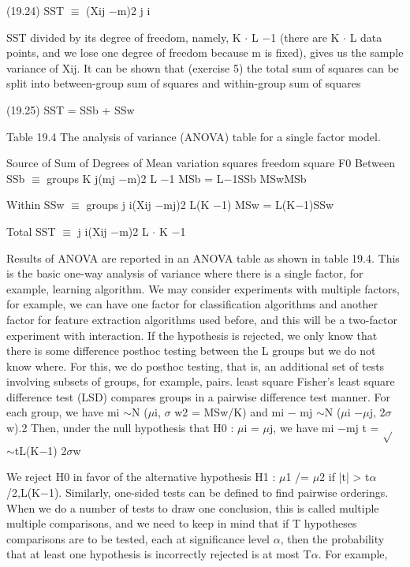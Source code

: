 (19.24) SST $\equiv$ (Xij $-$m)2 j i

SST divided by its degree of freedom, namely, K $\cdot$ L $-$1 (there are K $\cdot$ L data points, and we lose one degree of freedom because m is fixed), gives us the sample variance of Xij. It can be shown that (exercise 5) the total sum of squares can be split into between-group sum of squares and within-group sum of squares

(19.25) SST = SSb + SSw

Table 19.4 The analysis of variance (ANOVA) table for a single factor model.

Source of Sum of Degrees of Mean variation squares freedom square F0 Between SSb $\equiv$ groups K j(mj $-$m)2 L $-$1 MSb = L$-$1SSb MSwMSb

Within SSw $\equiv$ groups j i(Xij $-$mj)2 L(K $-$1) MSw = L(K$-$1)SSw

Total SST $\equiv$ j i(Xij $-$m)2 L $\cdot$ K $-$1

Results of ANOVA are reported in an ANOVA table as shown in table 19.4. This is the basic one-way analysis of variance where there is a single factor, for example, learning algorithm. We may consider experiments with multiple factors, for example, we can have one factor for classification algorithms and another factor for feature extraction algorithms used before, and this will be a two-factor experiment with interaction. If the hypothesis is rejected, we only know that there is some difference posthoc testing between the L groups but we do not know where. For this, we do posthoc testing, that is, an additional set of tests involving subsets of groups, for example, pairs. least square Fisher’s least square difference test (LSD) compares groups in a pairwise difference test manner. For each group, we have mi $\sim$N ($\mu$i, $\sigma$ w2 = MSw/K) and mi $-$ mj $\sim$N ($\mu$i $-$$\mu$j, 2$\sigma$ w).2 Then, under the null hypothesis that H0 : $\mu$i = $\mu$j, we have mi $-$mj t = $\sqrt{}$ $\sim$tL(K$-$1) 2$\sigma$w

We reject H0 in favor of the alternative hypothesis H1 : $\mu$1 /= $\mu$2 if |t| > t$\alpha$/2,L(K$-$1). Similarly, one-sided tests can be defined to find pairwise orderings. When we do a number of tests to draw one conclusion, this is called multiple multiple comparisons, and we need to keep in mind that if T hypotheses comparisons are to be tested, each at significance level $\alpha$, then the probability that at least one hypothesis is incorrectly rejected is at most T$\alpha$. For example,

